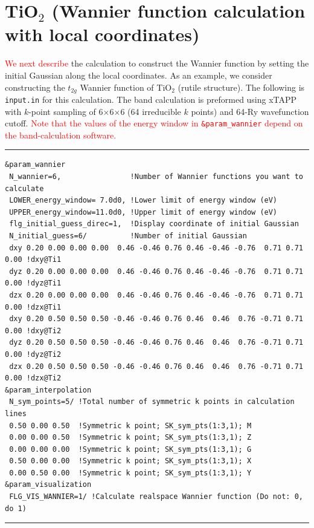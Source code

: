 \documentclass{article}
\newcommand{\tr}[1]{\textcolor{red}{#1}}
\begin{document}
\section{\label{TiO2}TiO$_2$ (Wannier function calculation with local coordinates)} 
\tr{We next describe} the calculation to construct the Wannier function by setting the initial Gaussian along the local coordinates. As an example, we consider constructing the $t_{2g}$ Wannier function of TiO$_2$ (rutile structure). The following is \verb+input.in+ for this calculation. The band calculation is preformed using {\sc xTAPP} with $k$-point sampling of 6$\times$6$\times$6 (64 irreducible $k$ points) and 64-Ry wavefunction cutoff. \tr{Note that the values of the energy window in {\tt \&param\_wannier} depend on the band-calculation software.}
\vspace{3mm}\hrule
\begin{verbatim}
&param_wannier 
 N_wannier=6,                !Number of Wannier functions you want to calculate
 LOWER_energy_window= 7.0d0, !Lower limit of energy window (eV)
 UPPER_energy_window=11.0d0, !Upper limit of energy window (eV)
 flg_initial_guess_direc=1,  !Display coordinate of initial Gaussian
 N_initial_guess=6/          !Number of initial Gaussian
 dxy 0.20 0.00 0.00 0.00  0.46 -0.46 0.76 0.46 -0.46 -0.76  0.71 0.71 0.00 !dxy@Ti1
 dyz 0.20 0.00 0.00 0.00  0.46 -0.46 0.76 0.46 -0.46 -0.76  0.71 0.71 0.00 !dyz@Ti1
 dzx 0.20 0.00 0.00 0.00  0.46 -0.46 0.76 0.46 -0.46 -0.76  0.71 0.71 0.00 !dzx@Ti1
 dxy 0.20 0.50 0.50 0.50 -0.46 -0.46 0.76 0.46  0.46  0.76 -0.71 0.71 0.00 !dxy@Ti2
 dyz 0.20 0.50 0.50 0.50 -0.46 -0.46 0.76 0.46  0.46  0.76 -0.71 0.71 0.00 !dyz@Ti2
 dzx 0.20 0.50 0.50 0.50 -0.46 -0.46 0.76 0.46  0.46  0.76 -0.71 0.71 0.00 !dzx@Ti2
&param_interpolation   
 N_sym_points=5/ !Total number of symmetric k points in calculation lines
 0.50 0.00 0.50  !Symmetric k point; SK_sym_pts(1:3,1); M
 0.00 0.00 0.50  !Symmetric k point; SK_sym_pts(1:3,1); Z
 0.00 0.00 0.00  !Symmetric k point; SK_sym_pts(1:3,1); G
 0.50 0.00 0.00  !Symmetric k point; SK_sym_pts(1:3,1); X
 0.00 0.50 0.00  !Symmetric k point; SK_sym_pts(1:3,1); Y
&param_visualization   
 FLG_VIS_WANNIER=1/ !Calculate realspace Wannier function (Do not: 0, do 1)     
\end{verbatim}
\hrule\vspace{3mm}
\end{document}

